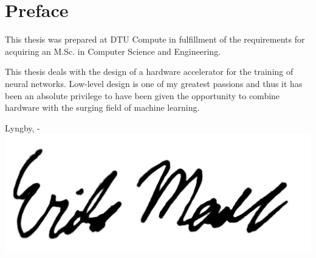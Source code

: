 \chapter{Preface}

This thesis was prepared at DTU Compute in fulfillment of the requirements for acquiring an M.Sc. in Computer Science and Engineering.

This thesis deals with the design of a hardware accelerator for the training of neural networks. Low-level design is one of my greatest passions and thus it has been an absolute privilege to have been given the opportunity to combine hardware with the surging field of machine learning. 

\vspace{20mm}
\begin{center}
    \hspace{20mm} Lyngby, \thesishandin-\thesisyear
    \vspace{5mm}
    \newline
    \includegraphics[scale=0.1]{figures/signature}
\end{center}
\begin{flushright}
    \thesisauthor
\end{flushright}
